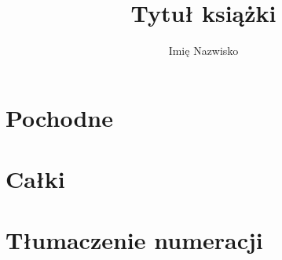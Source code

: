 \documentclass{parchment}
\author{Imię Nazwisko}
\title{Tytuł książki}
\begin{document}






\chapter{Pochodne}


\chapter{Całki}









\chapter{Tłumaczenie numeracji}


{}

\end{document}
